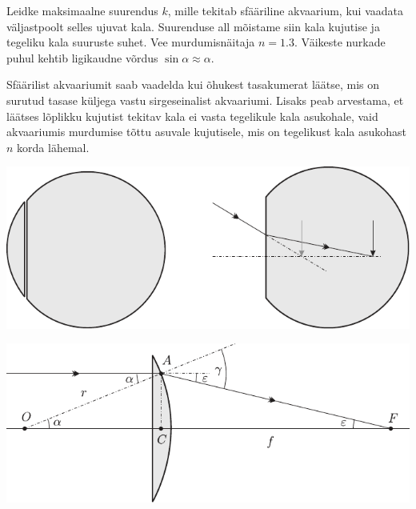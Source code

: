 
Leidke maksimaalne suurendus $k$, mille tekitab sfääriline akvaarium, kui vaadata väljastpoolt selles ujuvat kala. Suurenduse all mõistame siin kala kujutise ja tegeliku kala suuruste suhet. Vee murdumisnäitaja $n = \num{1,3}$. Väikeste nurkade puhul kehtib ligikaudne võrdus $\sin \alpha \approx \alpha$. 

\hint
Sfäärilist akvaariumit saab vaadelda kui õhukest tasakumerat läätse, mis on surutud tasase küljega vastu sirgeseinalist akvaariumi. Lisaks peab arvestama, et läätses lõplikku kujutist tekitav kala ei vasta tegelikule kala asukohale, vaid akvaariumis murdumise tõttu asuvale kujutisele, mis on tegelikust kala asukohast $n$ korda lähemal.

\solu
\begin{center}
	\includegraphics[width=\linewidth]{2005-lahg-10-lah1}
\end{center}

\begin{center}
	\includegraphics[width=\linewidth]{2005-lahg-10-lah2}
\end{center}

